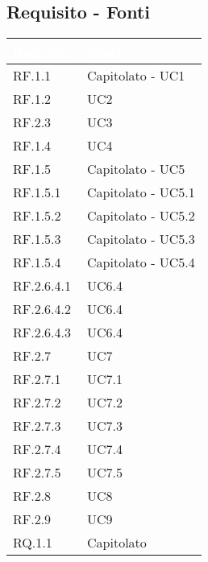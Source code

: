 \subsection{Requisito - Fonti}
\begin{center}
  \centering
  \begin{longtable}{|C{6cm}|C{6cm}|}
    \hline
    \textcolor[HTML]{FFFFFF}{\textbf{Requisito}} & \textcolor[HTML]{FFFFFF}{\textbf{Fonti}} \\ \hline
    RF.1.1 & Capitolato - UC1 \\ \hline
    RF.1.2 & UC2 \\ \hline
    RF.2.3 & UC3 \\ \hline
    RF.1.4 & UC4 \\ \hline
    RF.1.5 & Capitolato - UC5 \\ \hline
    RF.1.5.1 & Capitolato - UC5.1 \\ \hline
    RF.1.5.2 & Capitolato - UC5.2 \\ \hline
    RF.1.5.3 & Capitolato - UC5.3 \\ \hline
    RF.1.5.4 & Capitolato - UC5.4 \\ \hline
    RF.2.6.4.1 & UC6.4 \\ \hline
    RF.2.6.4.2 & UC6.4 \\ \hline
    RF.2.6.4.3 & UC6.4 \\ \hline
    RF.2.7 & UC7 \\ \hline
    RF.2.7.1 & UC7.1 \\ \hline
    RF.2.7.2 & UC7.2 \\ \hline
    RF.2.7.3 & UC7.3 \\ \hline
    RF.2.7.4 & UC7.4 \\ \hline
    RF.2.7.5 & UC7.5 \\ \hline
    RF.2.8 & UC8 \\ \hline
    RF.2.9 & UC9 \\ \hline
    RQ.1.1 & Capitolato \\ \hline

\end{longtable}
\end{center}
